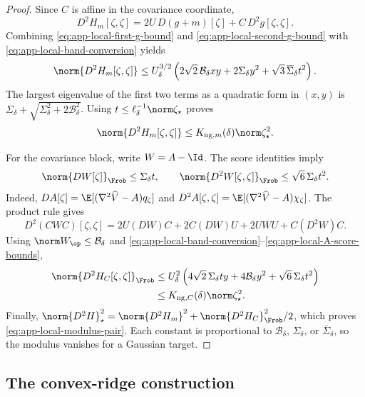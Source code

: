 \begin{proof}
Since \(C\) is affine in the covariance coordinate,
\[
  D^2H_m[\zeta,\zeta]
  =
  2U\,D(g+m)[\zeta]+C\,D^2g[\zeta,\zeta].
\]
Combining \eqref{eq:app-local-first-g-bound} and
\eqref{eq:app-local-second-g-bound} with
\eqref{eq:app-local-band-conversion} yields
\[
  \norm{D^2H_m[\zeta,\zeta]}
  \leq
  U_\delta^{3/2}
  \left(
    2\sqrt2\,\mathcal B_\delta xy
    +2\Sigma_\delta y^2
    +\sqrt3\,\overline\Sigma_\delta t^2
  \right).
\]
The largest eigenvalue of the first two terms as a quadratic form in
\((x,y)\) is
\(\Sigma_\delta+\sqrt{\Sigma_\delta^2+2\mathcal B_\delta^2}\).
Using \(t\leq\ell_\delta^{-1}\norm\zeta_\star\) proves
\begin{equation}
  \norm{D^2H_m[\zeta,\zeta]}
  \leq
  K_{\mathrm{ng},m}(\delta)\norm\zeta_\star^2.
  \label{eq:app-local-mean-modulus}
\end{equation}

For the covariance block, write \(W=A-\Id\).  The score identities imply
\begin{equation}
  \norm{DW[\zeta]}_{\Frob}\leq\Sigma_\delta t,\qquad
  \norm{D^2W[\zeta,\zeta]}_{\Frob}
  \leq\sqrt6\,\Sigma_\delta t^2.
  \label{eq:app-local-A-score-bounds}
\end{equation}
Indeed, \(DA[\zeta]=\E[(\nabla^2\widehat V-A)q_\zeta]\) and
\(D^2A[\zeta,\zeta]
=\E[(\nabla^2\widehat V-A)\chi_\zeta]\).
The product rule gives
\[
  D^2(CWC)[\zeta,\zeta]
  =
  2U(DW)C+2C(DW)U+2UWU+C(D^2W)C.
\]
Using \(\norm W_{\op}\leq\mathcal B_\delta\) and
\eqref{eq:app-local-band-conversion}--\eqref{eq:app-local-A-score-bounds},
\begin{align*}
  \norm{D^2H_C[\zeta,\zeta]}_{\Frob}
  &\leq
  U_\delta^2\left(
    4\sqrt2\,\Sigma_\delta ty
    +4\mathcal B_\delta y^2
    +\sqrt6\,\Sigma_\delta t^2
  \right)\\
  &\leq
  K_{\mathrm{ng},C}(\delta)\norm\zeta_\star^2.
\end{align*}
Finally,
\(\norm{D^2H}_\star^2
=\norm{D^2H_m}^2+\norm{D^2H_C}_{\Frob}^2/2\), which proves
\eqref{eq:app-local-modulus-pair}.  Each constant is proportional to
\(\mathcal B_\delta\), \(\Sigma_\delta\), or
\(\overline\Sigma_\delta\), so the modulus vanishes for a Gaussian target.
\end{proof}

\subsection{The convex-ridge construction}
\label{app:local-ridge-construction}

